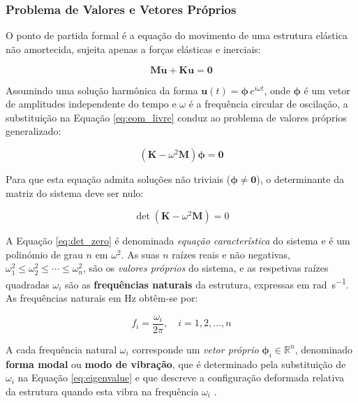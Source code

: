 \documentclass[a4paper,fleqn,noprintline]{cas-dc}
\begin{document}
\subsubsection{Problema de Valores e Vetores Próprios}

O ponto de partida formal é a equação do movimento de uma estrutura elástica não amortecida, sujeita apenas a forças elásticas e inerciais:

\begin{equation}
    \mathbf{M}\ddot{\mathbf{u}} + \mathbf{K}\mathbf{u} = \mathbf{0}
    \label{eq:eom_livre}
\end{equation}

Assumindo uma solução harmônica da forma $\mathbf{u}(t) = \boldsymbol{\phi} \, e^{i\omega t}$, onde $\boldsymbol{\phi}$ é um vetor de amplitudes independente do tempo e $\omega$ é a frequência circular de oscilação, a substituição na Equação \eqref{eq:eom_livre} conduz ao problema de valores próprios generalizado:

\begin{equation}
    \left( \mathbf{K} - \omega^2 \mathbf{M} \right) \boldsymbol{\phi} 
    = \mathbf{0}
    \label{eq:eigenvalue}
\end{equation}

Para que esta equação admita soluções não triviais ($\boldsymbol{\phi} \neq \mathbf{0}$), o determinante da matriz do sistema deve ser nulo:

\begin{equation}
    \det\left( \mathbf{K} - \omega^2 \mathbf{M} \right) = 0
    \label{eq:det_zero}
\end{equation}

A Equação \eqref{eq:det_zero} é denominada \textit{equação característica} do sistema e é um polinómio de grau $n$ em $\omega^2$. As suas $n$ raízes reais e não negativas, $\omega_1^2 \leq \omega_2^2 \leq \cdots \leq \omega_n^2$, são os \textit{valores próprios} do sistema, e as respetivas raízes quadradas $\omega_i$ são as \textbf{frequências naturais} da estrutura, expressas em \si{\radian\per\second}. As frequências naturais em \si{\hertz} obtêm-se por:

\begin{equation}
    f_i = \frac{\omega_i}{2\pi}, \quad i = 1, 2, \ldots, n
    \label{eq:freq_hz}
\end{equation}

A cada frequência natural $\omega_i$ corresponde um \textit{vetor próprio} $\boldsymbol{\phi}_i \in \mathbb{R}^n$, denominado \textbf{forma modal} ou \textbf{modo de vibração}, que é determinado pela substituição de $\omega_i$ na Equação \eqref{eq:eigenvalue} e que descreve a configuração deformada relativa da estrutura quando esta vibra na frequência $\omega_i$ \cite{Ewins2000, Maia1997}.
\end{document}
